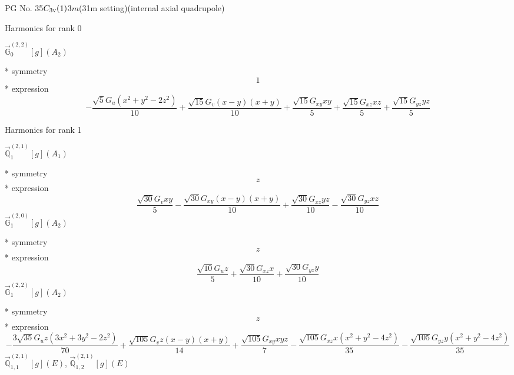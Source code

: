 \documentclass[fleqn,8pt]{jsarticle}
\begin{document}
\setcounter{MaxMatrixCols}{32}

\renewcommand{\tablename}{Table~}
\renewcommand{\figurename}{Figure~}
\begin{center}
\LARGE
PG No. 35\quad$C_{\rm 3v}(1)$\quad$3m$\quad(31m setting)\quad[ trigonal ] (internal axial quadrupole)
\end{center}

\noindent * Harmonics for rank 0

\noindent\quad $\vec{\mathbb{G}}_{0}^{(2,2)}[g](A_{2})$

\noindent\quad ** symmetry
\begin{dmath*}
1
\end{dmath*}
\noindent\quad ** expression
\begin{dmath*}
- \frac{\sqrt{5} G_{u} \left(x^{2} + y^{2} - 2 z^{2}\right)}{10} + \frac{\sqrt{15} G_{v} \left(x - y\right) \left(x + y\right)}{10} + \frac{\sqrt{15} G_{xy} x y}{5} + \frac{\sqrt{15} G_{xz} x z}{5} + \frac{\sqrt{15} G_{yz} y z}{5}
\end{dmath*}

\noindent * Harmonics for rank 1

\noindent\quad $\vec{\mathbb{Q}}_{1}^{(2,1)}[g](A_{1})$

\noindent\quad ** symmetry
\begin{dmath*}
z
\end{dmath*}
\noindent\quad ** expression
\begin{dmath*}
\frac{\sqrt{30} G_{v} x y}{5} - \frac{\sqrt{30} G_{xy} \left(x - y\right) \left(x + y\right)}{10} + \frac{\sqrt{30} G_{xz} y z}{10} - \frac{\sqrt{30} G_{yz} x z}{10}
\end{dmath*}
\noindent\quad $\vec{\mathbb{G}}_{1}^{(2,0)}[g](A_{2})$

\noindent\quad ** symmetry
\begin{dmath*}
z
\end{dmath*}
\noindent\quad ** expression
\begin{dmath*}
\frac{\sqrt{10} G_{u} z}{5} + \frac{\sqrt{30} G_{xz} x}{10} + \frac{\sqrt{30} G_{yz} y}{10}
\end{dmath*}
\noindent\quad $\vec{\mathbb{G}}_{1}^{(2,2)}[g](A_{2})$

\noindent\quad ** symmetry
\begin{dmath*}
z
\end{dmath*}
\noindent\quad ** expression
\begin{dmath*}
- \frac{3 \sqrt{35} G_{u} z \left(3 x^{2} + 3 y^{2} - 2 z^{2}\right)}{70} + \frac{\sqrt{105} G_{v} z \left(x - y\right) \left(x + y\right)}{14} + \frac{\sqrt{105} G_{xy} x y z}{7} - \frac{\sqrt{105} G_{xz} x \left(x^{2} + y^{2} - 4 z^{2}\right)}{35} - \frac{\sqrt{105} G_{yz} y \left(x^{2} + y^{2} - 4 z^{2}\right)}{35}
\end{dmath*}
\noindent\quad $\vec{\mathbb{Q}}_{1,1}^{(2,1)}[g](E)$, $\vec{\mathbb{Q}}_{1,2}^{(2,1)}[g](E)$
\end{document}
